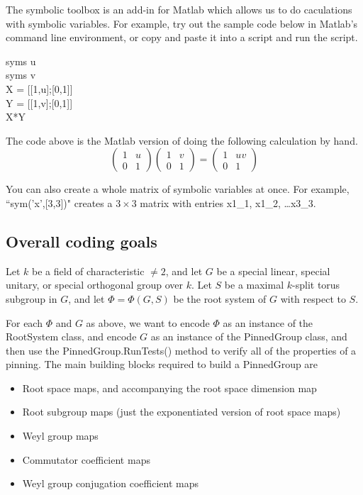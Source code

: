 \documentclass[12pt]{article}
\theoremstyle{definition}
\numberwithin{theorem}{subsection}
\newcommand{\noi}{\noindent}
\begin{document}
The symbolic toolbox is an add-in for Matlab which allows us to do caculations with symbolic variables. For example, try out the sample code below in Matlab's command line environment, or copy and paste it into a script and run the script.

\begin{framed}
\noi syms u \\
syms v \\
X = [[1,u];[0,1]] \\
Y = [[1,v];[0,1]] \\
X*Y
\end{framed}

\noi The code above is the Matlab version of doing the following calculation by hand.
\[
	\begin{pmatrix}
		1 & u \\
		0 & 1
	\end{pmatrix}
	\begin{pmatrix}
		1 & v \\
		0 & 1
	\end{pmatrix}
	=
	\begin{pmatrix}
		1 & uv \\
		0 & 1
	\end{pmatrix}
\]

\noi You can also create a whole matrix of symbolic variables at once. For example, ``sym('x',[3,3])" creates a $3 \times 3$ matrix with entries x1\_1, x1\_2, \ldots x3\_3.

\subsection{Overall coding goals}

Let $k$ be a field of characteristic $\neq 2$, and let $G$ be a special linear, special unitary, or special orthogonal group over $k$. Let $S$ be a maximal $k$-split torus subgroup in $G$, and let $\Phi = \Phi(G, S)$ be the root system of $G$ with respect to $S$. 

For each $\Phi$ and $G$ as above, we want to encode $\Phi$ as an instance of the RootSystem class, and encode $G$ as an instance of the PinnedGroup class, and then use the PinnedGroup.RunTests() method to verify all of the properties of a pinning. The main building blocks required to build a PinnedGroup are
\begin{itemize}
	\item Root space maps, and accompanying the root space dimension map
	\item Root subgroup maps (just the exponentiated version of root space maps)
	\item Weyl group maps
	\item Commutator coefficient maps
	\item Weyl group conjugation coefficient maps
\end{itemize}
\end{document}
